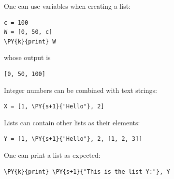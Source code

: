 \noindent
One can use variables when creating a list:\\

\begin{bbox}
\begin{Verbatim}[commandchars=\\\{\}]
c = 100
W = [0, 50, c]
\PY{k}{print} W
\end{Verbatim}
\end{bbox}
\vspace{6mm}

\noindent
whose output is \\

\begin{ybox}
\begin{Verbatim}[commandchars=\\\{\}]
[0, 50, 100]
\end{Verbatim}
\end{ybox}
\vspace{6mm}

\noindent
Integer numbers can be combined with text strings:\\

\begin{bbox}
\begin{Verbatim}[commandchars=\\\{\}]
X = [1, \PY{s+1}{"Hello"}, 2]
\end{Verbatim}
\end{bbox}
\vspace{6mm}

\noindent
Lists can contain other lists as their elements:\\

\begin{bbox}
\begin{Verbatim}[commandchars=\\\{\}]
Y = [1, \PY{s+1}{"Hello"}, 2, [1, 2, 3]]
\end{Verbatim}
\end{bbox}
\vspace{6mm}

\noindent
One can print a list as expected:\\

\begin{bbox}
\begin{Verbatim}[commandchars=\\\{\}]
\PY{k}{print} \PY{s+1}{"This is the list Y:"}, Y
\end{Verbatim}
\end{bbox}
\vspace{6mm}

